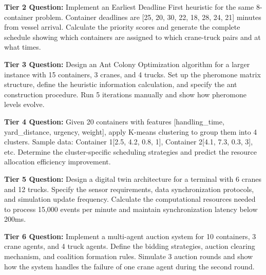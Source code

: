 \documentclass{article}
\begin{document}
\textbf{Tier 2 Question:} Implement an Earliest Deadline First heuristic for the same 8-container problem. Container deadlines are [25, 20, 30, 22, 18, 28, 24, 21] minutes from vessel arrival. Calculate the priority scores and generate the complete schedule showing which containers are assigned to which crane-truck pairs and at what times.

\textbf{Tier 3 Question:} Design an Ant Colony Optimization algorithm for a larger instance with 15 containers, 3 cranes, and 4 trucks. Set up the pheromone matrix structure, define the heuristic information calculation, and specify the ant construction procedure. Run 5 iterations manually and show how pheromone levels evolve.

\textbf{Tier 4 Question:} Given 20 containers with features [handling\_time, yard\_distance, urgency, weight], apply K-means clustering to group them into 4 clusters. Sample data: Container 1[2.5, 4.2, 0.8, 1], Container 2[4.1, 7.3, 0.3, 3], etc. Determine the cluster-specific scheduling strategies and predict the resource allocation efficiency improvement.

\textbf{Tier 5 Question:} Design a digital twin architecture for a terminal with 6 cranes and 12 trucks. Specify the sensor requirements, data synchronization protocols, and simulation update frequency. Calculate the computational resources needed to process 15,000 events per minute and maintain synchronization latency below 200ms.

\textbf{Tier 6 Question:} Implement a multi-agent auction system for 10 containers, 3 crane agents, and 4 truck agents. Define the bidding strategies, auction clearing mechanism, and coalition formation rules. Simulate 3 auction rounds and show how the system handles the failure of one crane agent during the second round.
\end{document}
